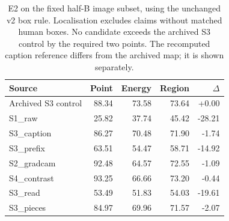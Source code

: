 \begin{table}[t]
\caption{E2 on the fixed half-B image subset, using the unchanged v2 box rule.
Localisation excludes claims without matched human boxes. No candidate exceeds the archived S3 control
by the required two points. The recomputed caption reference differs from the archived map; it is shown separately.}
\label{tab:look-e2}
\centering\footnotesize\setlength{\tabcolsep}{3pt}
\begin{tabular}{@{}lrrrr@{}}
\toprule
Source & Point & Energy & Region & $\Delta$ \\
\midrule
Archived S3 control & 88.34 & 73.58 & 73.64 & +0.00 \\
S1\_raw & 25.82 & 37.74 & 45.42 & -28.21 \\
S3\_caption & 86.27 & 70.48 & 71.90 & -1.74 \\
S3\_prefix & 63.51 & 54.47 & 58.71 & -14.92 \\
S2\_gradcam & 92.48 & 64.57 & 72.55 & -1.09 \\
S4\_contrast & 93.25 & 66.66 & 73.20 & -0.44 \\
S3\_read & 53.49 & 51.83 & 54.03 & -19.61 \\
S3\_pieces & 84.97 & 69.96 & 71.57 & -2.07 \\
\bottomrule\end{tabular}
\end{table}
